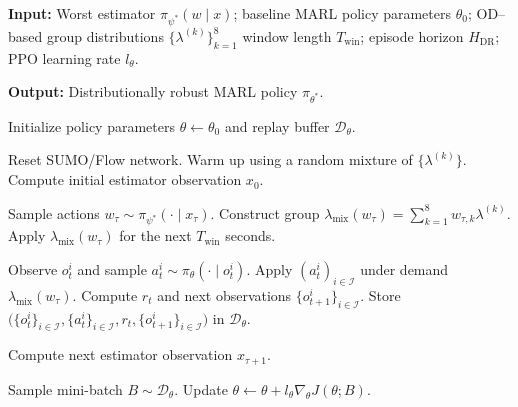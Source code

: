 \documentclass{ifacconf}
\newcommand{\1}{\mbox{1}\hspace{-0.25em}\mbox{l}}
\begin{document}
\begin{algorithm}[t!]
\caption{DR-MARL with a worst-case estimator}
\label{alg:DRMARL}
\begin{algorithmic}[1]
\State \textbf{Input:} Worst estimator $\pi_{\psi^\ast}(w \mid x)$;
baseline MARL policy parameters $\theta_0$;
OD--based group distributions $\{\lambda^{(k)}\}_{k=1}^8$
window length $T_{\mathrm{win}}$;
episode horizon $H_{\mathrm{DR}}$;
PPO learning rate $l_\theta$.

\State \textbf{Output:} Distributionally robust MARL policy $\pi_{\theta^\ast}$.

\State Initialize policy parameters $\theta \gets \theta_0$ and replay buffer $\mathcal{D}_\theta$.


    \State Reset SUMO/Flow network.
    \State Warm up using a random mixture of $\{\lambda^{(k)}\}$.
    \State Compute initial estimator observation $x_0$.



        \State Sample actions $w_\tau \sim \pi_{\psi^\ast}(\cdot \mid x_\tau)$.
        \State Construct group $\lambda_{\mathrm{mix}}(w_\tau) = \sum_{k=1}^8 w_{\tau,k}\lambda^{(k)}$.
        \State Apply $\lambda_{\mathrm{mix}}(w_\tau)$ for the next $T_{\mathrm{win}}$ seconds.

                \State Observe $o_t^i$ and sample $a_t^i \sim \pi_\theta(\cdot \mid o_t^i)$.
            \EndFor
            \State Apply $(a_t^i)_{i\in\mathcal{I}}$ under demand $\lambda_{\mathrm{mix}}(w_\tau)$.
            \State Compute $r_t$ and next observations $\{o_{t+1}^i\}_{i\in\mathcal{I}}$.
            \State Store $\big(\{o_t^i\}_{i\in\mathcal{I}}, \{a_t^i\}_{i\in\mathcal{I}}, r_t, \{o_{t+1}^i\}_{i\in\mathcal{I}}\big)$ in $\mathcal{D}_\theta$.
        \EndFor

        \State Compute next estimator observation $x_{\tau+1}$.

    \EndFor
    \State Sample mini-batch $B \sim \mathcal{D}_\theta$.
    \State Update $\theta \gets \theta + l_\theta \nabla_\theta J(\theta; B)$.

\EndFor

\end{algorithmic}
\end{algorithm}
\end{document}
